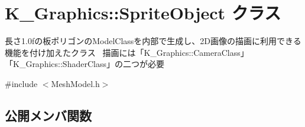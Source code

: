 \hypertarget{class_k___graphics_1_1_sprite_object}{}\section{K\+\_\+\+Graphics\+:\+:Sprite\+Object クラス}
\label{class_k___graphics_1_1_sprite_object}


長さ1.0fの板ポリゴンの\+Model\+Classを内部で生成し、2\+D画像の描画に利用できる機能を付け加えたクラス~\newline
描画には「\+K\+\_\+\+Graphics\+::\+Camera\+Class」「\+K\+\_\+\+Graphics\+::\+Shader\+Class」の二つが必要  




{\ttfamily \#include $<$Mesh\+Model.\+h$>$}

\subsection*{公開メンバ関数}

